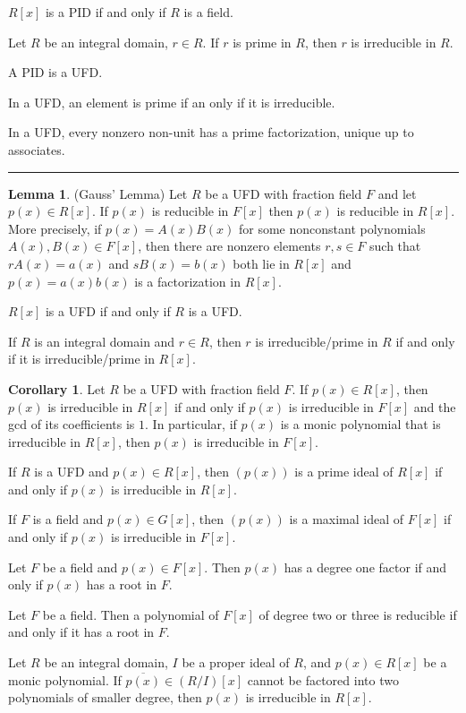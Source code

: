 \documentclass[12pt]{article}
\newcommand{\sepline}{\rule{\textwidth}{0.4pt}}
\theoremstyle{definition}
\newtheorem{corollary}{Corollary}
\newtheorem{lemma}{Lemma}
\newcommand{\<}{\left\langle}
\renewcommand{\>}{\right\rangle}
\newcommand{\eqc}{\overline}
\begin{document}
$R[x]$ is a PID if and only if $R$ is a field.

Let $R$ be an integral domain, $r \in R$. If $r$ is prime in $R$, then $r$ is irreducible in $R$.

A PID is a UFD.

In a UFD, an element is prime if an only if it is irreducible.

In a UFD, every nonzero non-unit has a prime factorization, unique up to associates.


\sepline

\begin{lemma}(Gauss' Lemma)
    Let $R$ be a UFD with fraction field $F$ and let $p(x) \in R[x]$. If $p(x)$ is reducible in $F[x]$ then $p(x)$ is reducible in $R[x]$. More precisely, if $p(x) = A(x)B(x)$ for some nonconstant polynomials $A(x), B(x) \in F[x]$, then there are nonzero elements $r, s \in F$ such that $rA(x) = a(x)$ and $sB(x) = b(x)$ both lie in $R[x]$ and $p(x) = a(x)b(x)$ is a factorization in $R[x]$.
\end{lemma}

$R[x]$ is a UFD if and only if $R$ is a UFD.

If $R$ is an integral domain and $r \in R$, then $r$ is irreducible/prime in $R$ if and only if it is irreducible/prime in $R[x]$.

\begin{corollary}
    Let $R$ be a UFD with fraction field $F$. If $p(x) \in R[x]$, then $p(x)$ is irreducible in $R[x]$ if and only if $p(x)$ is irreducible in $F[x]$ and the gcd of its coefficients is $1$. In particular, if $p(x)$ is a monic polynomial that is irreducible in $R[x]$, then $p(x)$ is irreducible in $F[x]$.
\end{corollary}

If $R$ is a UFD and $p(x) \in R[x]$, then $(p(x))$ is a prime ideal of $R[x]$ if and only if $p(x)$ is irreducible in $R[x]$.

If $F$ is a field and $p(x) \in G[x]$, then $(p(x))$ is a maximal ideal of $F[x]$ if and only if $p(x)$ is irreducible in $F[x]$.

Let $F$ be a field and $p(x) \in F[x]$. Then $p(x)$ has a degree one factor if and only if $p(x)$ has a root in $F$.

Let $F$ be a field. Then a polynomial of $F[x]$ of degree two or three is reducible if and only if it has a root in $F$.

Let $R$ be an integral domain, $I$ be a proper ideal of $R$, and $p(x) \in R[x]$ be a monic polynomial. If $\eqc{p(x)} \in (R/I)[x]$ cannot be factored into two polynomials of smaller degree, then $p(x)$ is irreducible in $R[x]$.
\end{document}
